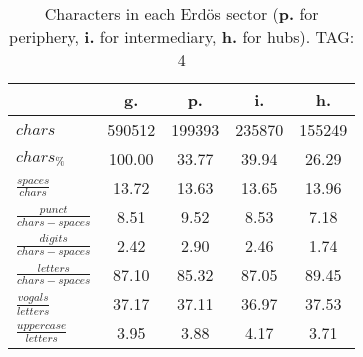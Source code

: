 \begin{table}[h!]
\begin{center}
\begin{tabular}{| l | c | c | c | c |}\hline
 & g. & p. & i. & h. \\\hline
$chars$ & 590512  & 199393  & 235870  & 155249 \\\hline
$chars_{\%}$ & 100.00  & 33.77  & 39.94  & 26.29 \\\hline
$\frac{spaces}{chars}$ & 13.72  & 13.63  & 13.65  & 13.96 \\\hline
$\frac{punct}{chars-spaces}$ & 8.51  & 9.52  & 8.53  & 7.18 \\\hline
$\frac{digits}{chars-spaces}$ & 2.42  & 2.90  & 2.46  & 1.74 \\\hline
$\frac{letters}{chars-spaces}$ & 87.10  & 85.32  & 87.05  & 89.45 \\\hline
$\frac{vogals}{letters}$ & 37.17  & 37.11  & 36.97  & 37.53 \\\hline
$\frac{uppercase}{letters}$ & 3.95  & 3.88  & 4.17  & 3.71 \\\hline
\end{tabular}
\caption{Characters in each Erd\"os sector ({{\bf p.}} for periphery, {{\bf i.}} for intermediary, 
    {{\bf h.}} for hubs). TAG: 4}
\end{center}
\end{table}